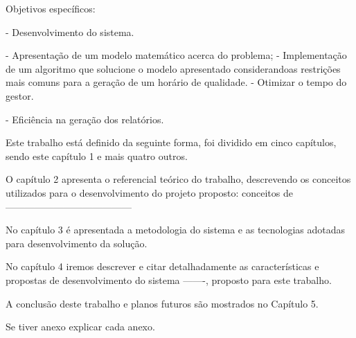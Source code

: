 
	Objetivos específicos:\par

	- Desenvolvimento do sistema.\par
	- Apresentação de um modelo matemático acerca do problema;
	- Implementação de um algoritmo que solucione o modelo apresentado considerandoas restrições mais comuns para a geração de um horário de qualidade.
	- Otimizar o tempo do gestor.\par
	- Eficiência na geração dos relatórios.\par



Este trabalho está definido da seguinte forma, foi dividido em cinco capítulos, sendo este capítulo 1 e mais quatro outros.\par

O capítulo 2 apresenta o referencial teórico do trabalho, descrevendo os conceitos utilizados para o desenvolvimento do projeto proposto: conceitos de ---------------------------------------\par

No capítulo 3 é apresentada a metodologia do sistema e as tecnologias adotadas para desenvolvimento da solução.\par

No capítulo 4 iremos descrever e citar detalhadamente as características e propostas de desenvolvimento do sistema -------, proposto para este trabalho.\par

A conclusão deste trabalho e planos futuros são mostrados no Capítulo 5.\par

Se tiver anexo explicar cada anexo.
